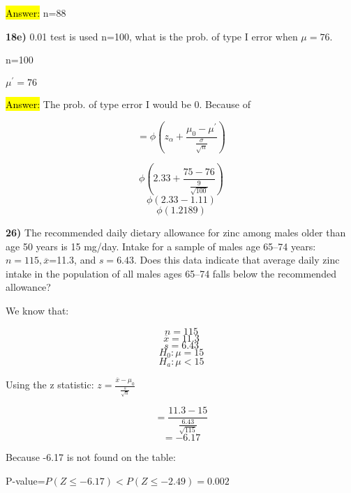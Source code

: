 \documentclass{article}
\begin{document}
\vspace{2mm}

\hl{Answer:} n=88


\vspace{5mm}

\textbf{18e)} 0.01 test is used n=100, what is the prob. of type I error when $\mu=76$.

\vspace{2mm}

n=100
 
$\mu^{'}=76$

\vspace{2mm}

\hl{Answer:} The prob. of type error I would be 0. Because of 

$$=\phi(z_{\alpha}+\frac{\mu_{0}-\mu^{'}}{\frac{\sigma}{\sqrt{n}}})$$

$$\phi(2.33+\frac{75-76}{\frac{9}{\sqrt{100}}})$$
$$\phi(2.33-1.11)$$
$$\phi(1.2189)$$










\newpage
\textbf{26)} The recommended daily dietary allowance for zinc among males older than age 50 years is 15 mg/day. Intake for a sample of males age 65–74 years: $n=115, \overline{x}$=11.3, and $s= 6.43$. Does this data indicate that average daily zinc intake in the population of all males ages 65–74 falls below the recommended allowance?

\vspace{3mm}

We know that:

\vspace{2mm}

$$n=115$$
$$ \overline{x}=11.3$$
$$s= 6.43$$
$$H_{0}: \mu=15$$
$$H_{a}: \mu<15$$

Using the z statistic: $z=\frac{\overline{x}-\mu_{0}}{\frac{s}{\sqrt{n}}}$

\vspace{2mm}

$$=\frac{11.3-15}{\frac{6.43}{\sqrt{115}}}$$
$$=-6.17$$

Because -6.17 is not found on the table:

\vspace{2mm}

P-value=$P(Z \le -6.17) < P(Z \le -2.49)=0.002$

\vspace{2mm}
\end{document}
